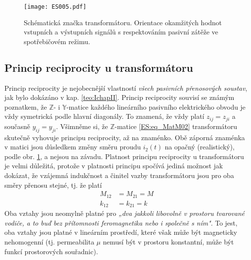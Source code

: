{      \begin{figure}[ht!] %
        \centering
        \texttt{[image: ES005.pdf]}
        \caption{Schématická značka transformátoru. Orientace okamžitých hodnot vstupních a  
                 výstupních signálů s respektováním pasivní zátěže ve spotřebičovém režimu.}
        \label{ES:fig_005}
      \end{figure}

    \subsection{Princip reciprocity u transformátoru}
      Princip reciprocity je nejobecnější vlastností \emph{všech pasivních přenosových soustav}, 
      jak bylo dokázáno v kap. \ref{teo:IchapII}. Princip reciprocity souvisí se známým 
      poznatkem, že \(\mathbb{Z}\)- i \(\mathbb{Y}\)-matice každého lineárního pasivního 
      elektrického obvodu je vždy symetrická podle hlavní diagonály. To znamená, že vždy platí 
      \(z_{ij} = z_{ji}\) a současně \(y_{ij} = y_{ji}\). Všimněme si, že \(\mathbb{Z}\)-matice 
      \ref{ES:eq_MatM02} transformátoru skutečně vyhovuje principu reciprocity, až na znaménko. Obě 
      záporná znaménka v matici jsou důsledkem změny směru proudu \(i_2(t)\) na opačný 
      (realistický), podle obr. \ref{ES:fig_005}, a nejsou na závadu. Platnost principu reciprocity 
      u transformátoru je velmi důležitá, protože v platnosti principu spočívá jediná možnost jak 
      dokázat, že vzájemná indukčnost a činitel vazby transformátoru jsou pro oba směry 
      přenosu stejné, tj. že platí
      \begin{subequations}
        \begin{align}
          M_{12} &= M_{21} = M  \label{teo:eq000a}\\
          k_{12} &= k_{21} = k  \label{teo:eq000b}
        \end{align}
      \end{subequations}
      Oba vztahy jsou neomylně platné pro \emph{„dva jakkoli libovolně v prostoru tvarované vodiče, 
      a to buď bez přítomnosti feromagnetika nebo i společně s ním".} To jest, oba vztahy jsou 
      platné v lineárním prostředí, které však může být magneticky nehomogenní (tj. permeabilita 
      \(\mu\) nemusí být v prostoru konstantní, může být funkcí prostorových souřadnic).
    
}
